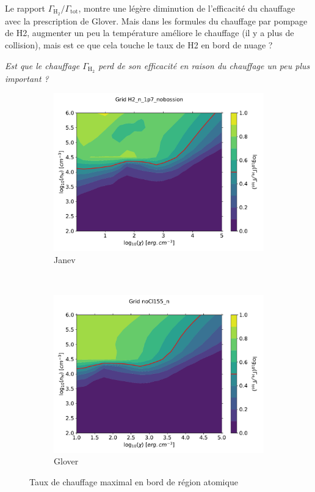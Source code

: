 Le rapport $\Gamma_{\mathrm{H}_2}/\Gamma_{\mathrm{tot}}$, montre une légère diminution de l'efficacité du chauffage avec la prescription de Glover.  Mais dans les formules du chauffage par pompage de H2, augmenter un peu la température améliore le chauffage (il y a plus de collision), mais est ce que cela touche le taux de H2 en bord de nuage ? 

\textit{Est que le chauffage $\Gamma_\mathrm{H}_2$ perd de son efficacité en raison du chauffage un peu plus important ?}

\begin{figure}[!htbp]
    \centering
    \begin{subfigure}[t]{0.45\textwidth} %
        \centering \includegraphics[trim = {0 0 0 0 },clip,width=1\textwidth]{figure/H2/JanevGlover/janev/mapG_H2.pdf}
        \caption{Janev}
    \end{subfigure}
    ~ 
    \begin{subfigure}[t]{0.45\textwidth}
        \centering \includegraphics[trim = {0 0 0 0 },clip,width=1\textwidth]{figure/H2/JanevGlover/glover/mapG_H2.pdf}
        \caption{Glover}
    \end{subfigure}
    \caption{Taux de chauffage maximal en bord de région atomique}
    \label{fig:H2:JanevGlover:Gmax}
\end{figure}

